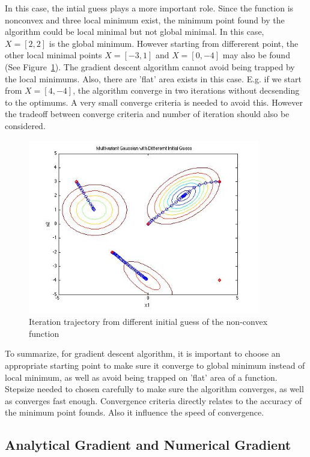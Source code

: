 In this case, the intial guess plays a more important role. Since the function is nonconvex and three local minimum exist, the minimum point found by the algorithm could be local minimal but not global minimal. In this case, $X = [2,2]$ is the global minimum. However starting from differerent point, the other local minimal points $X = [-3,1]$ and $X = [0,-4]$ may also be found (See Figure~\ref{fig:GaussianInit}). The gradient descent algorithm cannot avoid being trapped by the local minimums. Also, there are 'flat' area exists in this case. E.g. if we start from $X = [4,-4]$, the algorithm converge in two iterations without decsending to the optimums. A very small converge criteria is needed to avoid this. However the tradeoff between converge criteria and number of iteration should also be considered.

\begin{figure}[h]
\centering
\includegraphics[height=3in]{figures/p1_MultivarianGaussianWDifferenrtInitial} 
    \caption{Iteration trajectory from different initial guess of the non-convex function}
    \label{fig:GaussianInit}
\end{figure}

To summarize, for gradient descent algorithm, it is important to choose an appropriate starting point to make sure it converge to global minimum instead of local minimum, as well as avoid being trapped on 'flat' area of a function. 
Stepsize needed to chosen carefully to make sure the algorithm converges, as well as converges fast enough.
Convergence criteria directly relates to the accuracy of the minimum point founds. Also it influence the speed of convergence.





\subsection{Analytical Gradient and Numerical Gradient }

